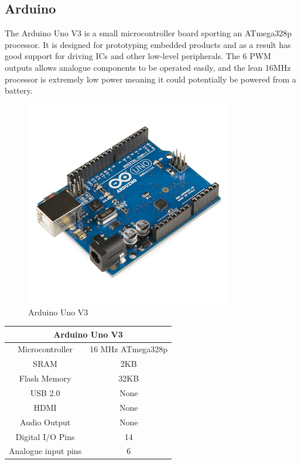 \documentclass[10pt]{article}
\begin{document}
\subsection{Arduino}
The Arduino Uno V3 is a small microcontroller board sporting an ATmega328p processor. It is designed for prototyping embedded products and as a result has good support for driving ICs and other low-level peripherals. The 6 PWM outputs allows analogue components to be operated easily, and the lean 16MHz processor is extremely low power meaning it could potentially be powered from a battery.

\begin{figure}[h]
\centering
\caption{Arduino Uno V3}
\label{Arduino Uno V3}
\includegraphics[height=9cm]{images/Arduino.jpg}
\end{figure}

\begin{center}
	\begin{tabular}{ | c | c | }
		\hline
	 	\multicolumn{2}{|c|}{Arduino Uno V3} \\ \hline
		Microcontroller 	& 16 MHz ATmega328p \\ \hline
		SRAM 			& 2KB \\ \hline
		Flash Memory	& 32KB \\ \hline
		USB 2.0		& None \\ \hline
		HDMI 			& None \\ \hline
		Audio Output	& None \\ \hline
		Digital I/O Pins	& 14 \\ \hline
		Analogue input pins & 6 \\ \hline
	\end{tabular}
\end{center}
\newpage
\end{document}
